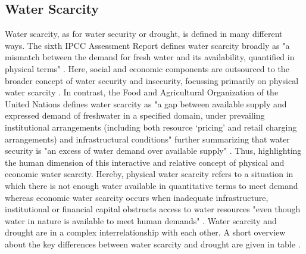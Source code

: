 {\subsection{Water Scarcity}\label{subsec:water_scarcity}

Water scarcity, as for water security or drought, is defined in many different ways. The sixth IPCC Assessment Report defines water scarcity broadly as "a mismatch between the demand for fresh water and its availability, quantified in physical terms" \autocite[560]{caretta2022water}. Here, social and economic components are outsourced to the broader concept of water security and insecurity, focussing primarily on physical water scarcity \autocite{caretta2022water}. In contrast, the Food and Agricultural Organization of the United Nations defines water scarcity as "a gap between available supply and expressed demand of freshwater in a specified domain, under prevailing institutional arrangements (including both resource ‘pricing’ and retail charging arrangements) and infrastructural conditions" \autocite[5]{faoCopingWaterScarcity2012} further summarizing that water security is "an excess of water demand over available supply" \autocite[6]{faoCopingWaterScarcity2012}. Thus, highlighting the human dimension of this interactive and relative concept of physical and economic water scarcity. Hereby, physical water scarcity refers to a situation in which there is not enough water available in quantitative terms to meet demand whereas economic water scarcity occurs when inadequate infrastructure, institutional or financial capital obstructs access to water resources "even though water in nature is available to meet human demands" \autocites{idmpDroughtWaterScarcity2022}[11]{moldenWaterFoodWater2007}.
Water scarcity and drought are in a complex interrelationship with each other. A short overview about the key differences between water scarcity and drought are given in table . 

}
